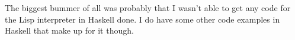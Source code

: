 \documentclass[11pt]{article}
\begin{document}
The biggest bummer of all was probably that I wasn't able to get any code for
the Lisp interpreter in Haskell done. I do have some other code examples in
Haskell that make up for it though.


\newpage
\thispagestyle{empty}
\mbox{}
\newpage

\newpage
\nocite{*}
\printbibliography[heading=bibintoc, title={Bibliography}]

\newpage
\thispagestyle{empty}
\mbox{}
\newpage
\end{document}
